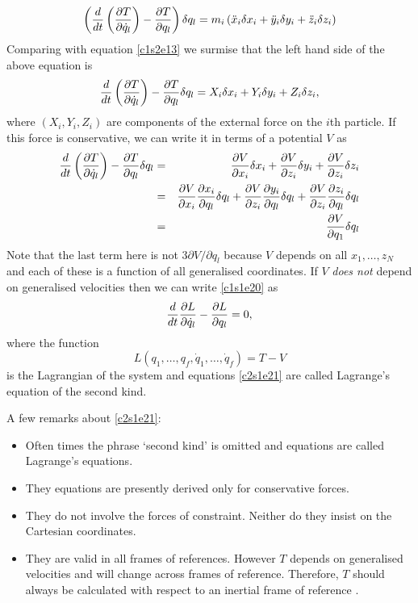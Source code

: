 \begin{equation}\label{c2s1e17}
\left(\frac{d}{dt}\left(\frac{\partial{T}}{\partial{\dot{q}_l}}\right) - \frac{\partial{T}}{\partial{q_l}}\right)\delta q_l
= m_i\left(\ddot{x}_i\delta x_i + \ddot{y}_i\delta y_i +
 \ddot{z}_i\delta z_i\right)
\end{equation}
Comparing with equation \eqref{c1s2e13} we surmise that the left hand side
of the above equation is
\begin{equation}
\frac{d}{dt}\left(\frac{\partial{T}}{\partial{\dot{q}_l}}\right) - \frac{\partial{T}}{\partial{q_l}}\delta q_l =
X_i\delta x_i + Y_i\delta y_i + Z_i \delta z_i,
\end{equation}
where $(X_i, Y_i, Z_i)$ are components of the external force on the $i$th
particle. If this force is conservative, we can write it in terms of a 
potential $V$ as
\begin{eqnarray}
\frac{d}{dt}\left(\frac{\partial{T}}{\partial{\dot{q}_l}}\right) - \frac{\partial{T}}{\partial{q_l}}\delta q_l &=&
\frac{\partial{V}}{\partial{x_i}}\delta x_i + \frac{\partial{V}}{\partial{z_i}}\delta y_i + \frac{\partial{V}}{\partial{z_i}} \delta z_i \nonumber \\
&=&
\frac{\partial{V}}{\partial{x_i}}\frac{\partial{x_i}}{\partial{q_l}}\delta q_l + \frac{\partial{V}}{\partial{z_i}}\frac{\partial{y_i}}{\partial{q_l}}\delta q_l + 
\frac{\partial{V}}{\partial{z_i}} \frac{\partial{z_i}}{\partial{q_l}}\delta q_l \nonumber \\
&=& \frac{\partial{V}}{\partial{q_1}}\delta q_l \label{c1s1e20}
\end{eqnarray}
Note that the last term here is not $3\partial V/\partial q_l$ because $V$
depends on all $x_1, \ldots, z_N$ and each of these is a function of all 
generalised coordinates. If $V$ \emph{does not} depend on generalised 
velocities then we can write \eqref{c1s1e20} as
\begin{equation}\label{c2s1e21}
\frac{d}{dt}\frac{\partial{L}}{\partial{\dot{q}_l}} - \frac{\partial{L}}{\partial{q_l}} = 0,
\end{equation}
where the function
\begin{equation}\label{c1s1e22}
L(q_1, \ldots, q_f, \dot{q}_1, \ldots, \dot{q}_f) = T - V
\end{equation}
is the Lagrangian of the system and equations \eqref{c2s1e21} are called
Lagrange's equation of the second kind.

A few remarks about \eqref{c2s1e21}:
\begin{itemize}
\item Often times the phrase `second kind' is omitted and equations
are called Lagrange's equations.
\item They equations are presently derived only for conservative forces.
\item They do not involve the forces of constraint. Neither do they insist on
the Cartesian coordinates. 
\item They are valid in all frames of references. However $T$ depends on 
generalised velocities and will change across frames of reference. Therefore,
$T$ should always be calculated with respect to an inertial frame of 
reference \cite[p. 31]{akr}.
\end{itemize}

